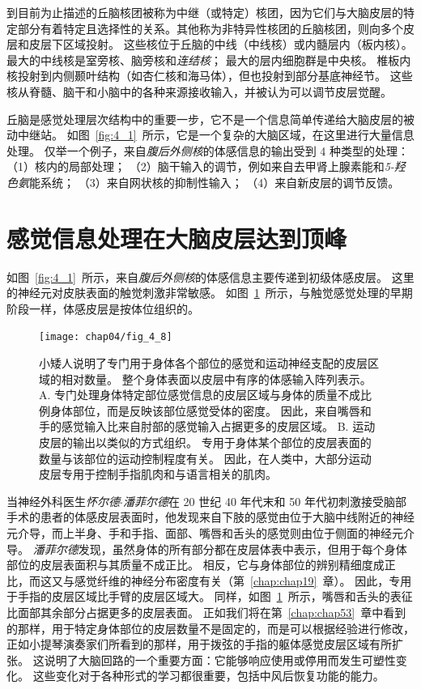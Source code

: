 到目前为止描述的丘脑核团被称为中继（或特定）核团，因为它们与大脑皮层的特定部分有着特定且选择性的关系。其他称为非特异性核团的丘脑核团，则向多个皮层和皮层下区域投射。
这些核位于丘脑的中线（中线核）或内髓层内（板内核）。 
最大的中线核是室旁核、脑旁核和\textit{连结核}；
最大的层内细胞群是中央核。 
椎板内核投射到内侧颞叶结构（如杏仁核和海马体），但也投射到部分基底神经节。
这些核从脊髓、脑干和小脑中的各种来源接收输入，并被认为可以调节皮层觉醒。


丘脑是感觉处理层次结构中的重要一步，它不是一个信息简单传递给大脑皮层的被动中继站。 
如图~\ref{fig:4_1}~所示，它是一个复杂的大脑区域，在这里进行大量信息处理。 
仅举一个例子，来自\textit{腹后外侧核}的体感信息的输出受到 4 种类型的处理：
（1）核内的局部处理；
（2）脑干输入的调节，例如来自去甲肾上腺素能和\textit{5-羟色氨}能系统； 
（3）来自网状核的抑制性输入； 
（4）来自新皮层的调节反馈。


\section{感觉信息处理在大脑皮层达到顶峰}

如图~\ref{fig:4_1}~所示，来自\textit{腹后外侧核}的体感信息主要传递到初级体感皮层。 
这里的神经元对皮肤表面的触觉刺激非常敏感。
如图~\ref{fig:4_8}~所示，与触觉感觉处理的早期阶段一样，体感皮层是按体位组织的。


\begin{figure}[htbp]
	\centering
	\texttt{[image: chap04/fig\_4\_8]}
	\caption{小矮人说明了专门用于身体各个部位的感觉和运动神经支配的皮层区域的相对数量。
		整个身体表面以皮层中有序的体感输入阵列表示。
		A. 专门处理身体特定部位感觉信息的皮层区域与身体的质量不成比例身体部位，而是反映该部位感觉受体的密度。
		因此，来自嘴唇和手的感觉输入比来自肘部的感觉输入占据更多的皮层区域。
		B. 运动皮层的输出以类似的方式组织。
		专用于身体某个部位的皮层表面的数量与该部位的运动控制程度有关。
		因此，在人类中，大部分运动皮层专用于控制手指肌肉和与语言相关的肌肉。}
	\label{fig:4_8}
\end{figure}


当神经外科医生\textit{怀尔德$\cdot$潘菲尔德}在 20 世纪 40 年代末和 50 年代初刺激接受脑部手术的患者的体感皮层表面时，他发现来自下肢的感觉由位于大脑中线附近的神经元介导，而上半身、手和手指、面部、嘴唇和舌头的感觉则由位于侧面的神经元介导。
\textit{潘菲尔德}发现，虽然身体的所有部分都在皮层体表中表示，但用于每个身体部位的皮层表面积与其质量不成正比。 
相反，它与身体部位的辨别精细度成正比，而这又与感觉纤维的神经分布密度有关（第~\ref{chap:chap19}~章）。 
因此，专用于手指的皮层区域比手臂的皮层区域大。 
同样，如图~\ref{fig:4_8}~所示，嘴唇和舌头的表征比面部其余部分占据更多的皮层表面。
正如我们将在第~\ref{chap:chap53}~章中看到的那样，用于特定身体部位的皮层数量不是固定的，而是可以根据经验进行修改，正如小提琴演奏家们所看到的那样，用于拨弦的手指的躯体感觉皮层区域有所扩张。
这说明了大脑回路的一个重要方面：它能够响应使用或停用而发生可塑性变化。
这些变化对于各种形式的学习都很重要，包括中风后恢复功能的能力。


